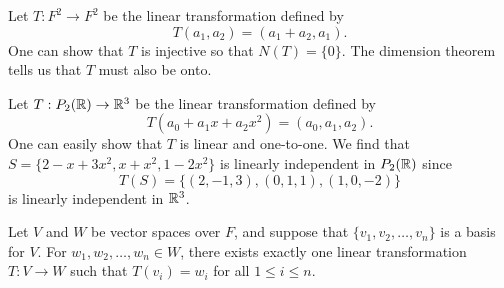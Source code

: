 \begin{eg}
    Let \( T: F^{2} \to F^{2}  \) be the linear transformation defined by 
    \[ T(a_{1}, a_{2}) = (a_{1} + a_{2}, a_{1}).  \]
    One can show that \( T  \) is injective so that \( N(T) = \{ 0 \}  \). The dimension theorem tells us that \( T  \) must also be onto.
\end{eg}

\begin{eg}
    Let \( T: P_{2}(\mathbb{R}) \to \mathbb{R}^{3} \) be the linear transformation defined by 
    \[  T(a_{0} + a_{1}x + a_{2} x^{2}) = (a_{0}, a_{1}, a_{2}). \]
    One can easily show that \( T  \) is linear and one-to-one. We find that \( S = \{ 2 - x + 3x^{2} , x + x^{2} , 1 - 2x^{2} \}  \) is linearly independent in \( P_{2}(\mathbb{R}) \) since 
    \[  T(S) = \{ (2,-1,3), (0,1,1), (1,0,-2) \}  \] is linearly independent in \( \mathbb{R}^{3} \).
\end{eg}

\begin{theorem}\label{Theorem 2.6}
    Let \( V  \) and \( W  \) be vector spaces over \( F  \), and suppose that \( \{ v_{1}, v_{2}, \dots, v_{n} \}   \) is a basis for \( V  \). For \( w_{1}, w_{2},  \dots, w_{n} \in W   \), there exists exactly one linear transformation \( T: V \to W  \) such that \( T(v_{i}) = w_{i}  \) for all \( 1 \leq i \leq n  \). 
\end{theorem}

